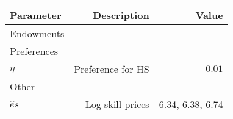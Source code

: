 \begin{tabular}{lrr}
\hline
Parameter & Description  & Value  \\ 
\hline
Endowments &   &   \\ 
Preferences &   &   \\ 
$\bar{\eta}$ & Preference for HS  & $0.01$  \\ 
Other &   &   \\ 
$\hat{e}{s}$ & Log skill prices  & 6.34, 6.38, 6.74  \\ 
\hline
\end{tabular}%
